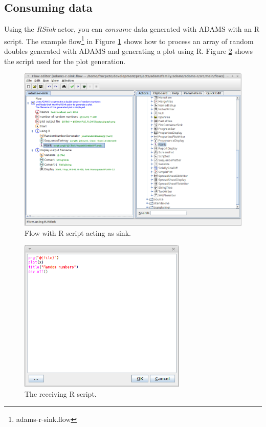 \documentclass[a4paper]{book}
\begin{document}
\subsection{Consuming data}
Using the \textit{RSink} actor, you can \textit{consume} data generated with
ADAMS with an R script. The example flow\footnote{adams-r-sink.flow} in
Figure \ref{sink-flow} shows how to process an array of random doubles 
generated with ADAMS and generating a plot using R. Figure \ref{sink-script}
shows the script used for the plot generation.
\begin{figure}[ht]
	\centering
	\includegraphics[width=\textwidth]{images/sink-flow.png}
	\caption{Flow with R script acting as sink.}
	\label{sink-flow}
\end{figure}
\begin{figure}[ht]
	\centering
	\includegraphics[width=8cm]{images/sink-script.png}
	\caption{The receiving R script.}
	\label{sink-script}
\end{figure}
\end{document}
